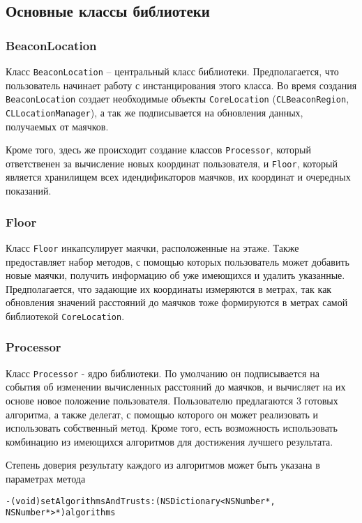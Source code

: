 \subsection{Основные классы библиотеки}

\subsubsection{BeaconLocation}

Класс \texttt{BeaconLocation} – центральный класс библиотеки. Предполагается, что пользователь начинает работу с инстанцирования этого класса. Во время создания \texttt{BeaconLocation} создает необходимые объекты \texttt{CoreLocation} (\texttt{CLBeaconRegion}, \texttt{CLLocationManager}), а так же подписывается на обновления данных, получаемых от маячков.

Кроме того, здесь же происходит создание классов \texttt{Processor}, который ответственен за вычисление новых координат пользователя, и \texttt{Floor}, который является хранилищем всех идендификаторов маячков, их координат и очередных показаний.

\subsubsection{Floor}

Класс \texttt{Floor} инкапсулирует маячки, расположенные на этаже. Также пре\-до\-став\-ляет набор методов, с помощью которых пользователь может добавить новые маячки, получить информацию об уже имеющихся и удалить указанные. Предполагается, что задающие их координаты измеряются в метрах, так как обновления значений расстояний до маячков тоже формируются в метрах самой библиотекой \texttt{CoreLocation}.

\subsubsection{Processor}

Класс \texttt{Processor} - ядро библиотеки. По умолчанию он подписывается на события об изменении вычисленных расстояний до маячков, и вычисляет на их основе новое положение пользователя. 
Пользователю предлагаются 3 готовых алгоритма, а также делегат, с помощью которого он может реализовать и использовать собственный метод. Кроме того, есть возможность использовать комбинацию из имеющихся алгоритмов для достижения лучшего результата.

Степень доверия результату каждого из алгоритмов может быть указана в параметрах метода \\
\begin{small}
\texttt{-(void)setAlgorithmsAndTrusts:(NSDictionary<NSNumber*, NSNumber*>*)algorithms}
\end{small}

